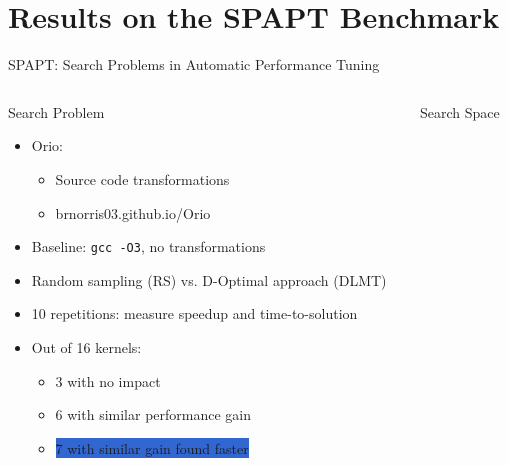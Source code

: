 \documentclass[10pt, compress, aspectratio=169, xcolor={table,usenames,dvipsnames}]{beamer}
\begin{document}
\section{Results on the SPAPT Benchmark}
\label{sec:org2e969d5}
\begin{frame}[label={sec:orge56db44},fragile]{SPAPT: Search Problems in Automatic Performance Tuning}
 \begin{columns}
\begin{column}{0.41\columnwidth}
\begin{block}{Search Problem}
\begin{itemize}
\item \alert{Orio}:
\begin{itemize}
\item \alert{Source code transformations}
\item brnorris03.github.io/Orio
\end{itemize}
\item \alert{Baseline}: \texttt{gcc -O3}, no transformations
\item \alert{Random sampling} (\alert{RS}) vs. \alert{D-Optimal} approach (\alert{DLMT})
\item \alert{10 repetitions}: measure \alert{speedup} and \alert{time-to-solution}
\item Out of \alert{16 kernels}:
\begin{itemize}
\item 3 with \alert{no impact}
\item 6 with \alert{similar performance gain}
\item \colorbox{Highlight}{7 with \alert{similar gain found faster}}
\end{itemize}
\end{itemize}
\end{block}
\end{column}
\begin{column}{0.59\columnwidth}
\begin{block}{Search Space}
\vspace{-0.4cm}


\end{block}
\end{column}
\end{columns}
\end{frame}
\end{document}
